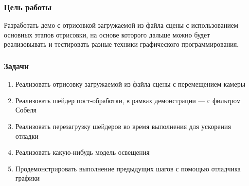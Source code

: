 \begin{frame}
    \frametitle{Цель работы}
    Разработать демо с отрисовкой загружаемой из файла сцены
    с использованием основных этапов отрисовки,
    на основе которого дальше можно будет
    реализовывать и тестировать разные
    техники графического программирования.
\end{frame}

\begin{frame}
    \frametitle{Задачи}
    \begin{enumerate}
        \item Реализовать отрисовку загружаемой из файла сцены с перемещением камеры
        \item Реализовать шейдер пост-обработки, в рамках демонстрации --- с фильтром Собеля
        \item Реализовать перезагрузку шейдеров во время выполнения для ускорения отладки
        \item Реализовать какую-нибудь модель освещения
        \item Продемонстрировать выполнение предыдущих
        шагов с помощью отладчика графики
    \end{enumerate}
\end{frame}
